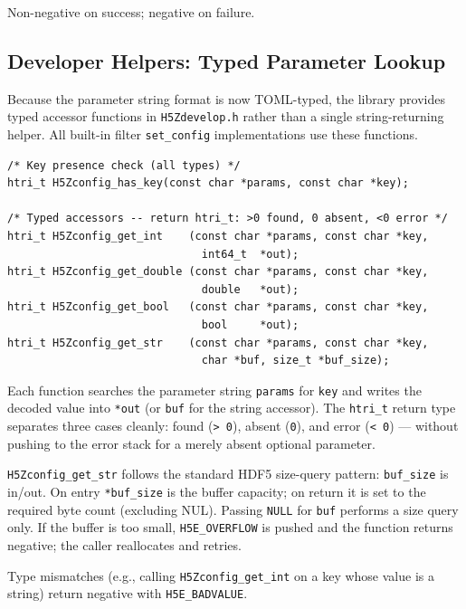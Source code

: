 \documentclass[../RFC-HDFG-2026-001.tex]{subfiles}
\begin{document}
Non-negative on success; negative on failure.


\subsection{Developer Helpers: Typed Parameter Lookup}
\label{sec:config-get-param}

Because the parameter string format is now TOML-typed, the library provides
typed accessor functions in \texttt{H5Zdevelop.h} rather than a single
string-returning helper.  All built-in filter \texttt{set\_config} implementations
use these functions.

\begin{verbatim}
/* Key presence check (all types) */
htri_t H5Zconfig_has_key(const char *params, const char *key);

/* Typed accessors -- return htri_t: >0 found, 0 absent, <0 error */
htri_t H5Zconfig_get_int    (const char *params, const char *key,
                              int64_t  *out);
htri_t H5Zconfig_get_double (const char *params, const char *key,
                              double   *out);
htri_t H5Zconfig_get_bool   (const char *params, const char *key,
                              bool     *out);
htri_t H5Zconfig_get_str    (const char *params, const char *key,
                              char *buf, size_t *buf_size);
\end{verbatim}

Each function searches the parameter string \texttt{params} for \texttt{key}
and writes the decoded value into \texttt{*out} (or \texttt{buf} for the string
accessor).  The \texttt{htri\_t} return type separates three cases cleanly:
found (\texttt{>~0}), absent (\texttt{0}), and error (\texttt{<~0}) ---
without pushing to the error stack for a merely absent optional parameter.

\texttt{H5Zconfig\_get\_str} follows the standard HDF5 size-query pattern:
\texttt{buf\_size} is in/out.  On entry \texttt{*buf\_size} is the buffer
capacity; on return it is set to the required byte count (excluding NUL).
Passing \texttt{NULL} for \texttt{buf} performs a size query only.  If the
buffer is too small, \texttt{H5E\_OVERFLOW} is pushed and the function returns
negative; the caller reallocates and retries.

Type mismatches (e.g., calling \texttt{H5Zconfig\_get\_int} on a key whose
value is a string) return negative with \texttt{H5E\_BADVALUE}.
\end{document}
